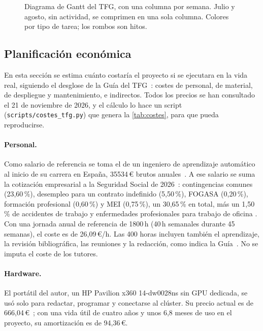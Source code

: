 \begin{landscape}
\begin{figure}[p]
  \centering
  
  \caption{Diagrama de Gantt del TFG, con una columna por semana. Julio y agosto, sin actividad, se comprimen en una sola columna. Colores por tipo de tarea; los rombos son hitos.}
  \label{fig:gantt}
\end{figure}
\end{landscape}

\subsection{Planificación económica}\label{sec:planificacion-economica}

En esta sección se estima cuánto costaría el proyecto si se ejecutara en la vida real, siguiendo el desglose de la Guía del TFG~\cite{guiatfg2025}: costes de personal, de material, de despliegue y mantenimiento, e indirectos. Todos los precios se han consultado el 21 de noviembre de 2026, y el cálculo lo hace un script (\texttt{scripts/costes\_tfg.py}) que genera la \cref{tab:costes}, para que pueda reproducirse.

\paragraph{Personal.} Como salario de referencia se toma el de un ingeniero de aprendizaje automático al inicio de su carrera en España, \num{35534}\,€ brutos anuales~\cite{preciopayscale2026}. A ese salario se suma la cotización empresarial a la Seguridad Social de 2026~\cite{ordenpjc2026}: contingencias comunes (23,60\,\%), desempleo para un contrato indefinido (5,50\,\%), FOGASA (0,20\,\%), formación profesional (0,60\,\%) y MEI (0,75\,\%), un 30,65\,\% en total, más un 1,50\,\% de accidentes de trabajo y enfermedades profesionales para trabajo de oficina . Con una jornada anual de referencia de \num{1800}\,h (40\,h semanales durante 45 semanas), el coste es de 26,09\,€/h. Las 400 horas incluyen también el aprendizaje, la revisión bibliográfica, las reuniones y la redacción, como indica la Guía~\cite{guiatfg2025}. No se imputa el coste de los tutores.

\paragraph{Hardware.} El portátil del autor, un HP Pavilion x360 14-dw0028ns sin GPU dedicada, se usó solo para redactar, programar y conectarse al clúster. Su precio actual es de 666,04\,€~\cite{preciohp2026}; con una vida útil de cuatro años y unos 6,8 meses de uso en el proyecto, su amortización es de 94,36\,€.

